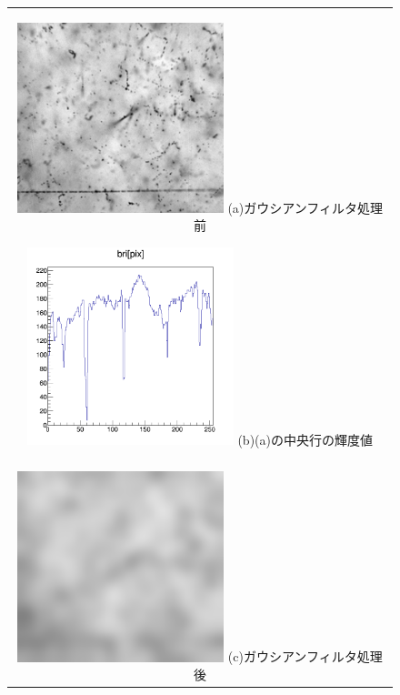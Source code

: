\documentclass[12pt,a4paper]{jarticle}
\begin{document}
\begin{figure}[htbp]
  \centering
      \begin{tabular}{c}
        \begin{minipage}{0.5\hsize}
          \centering
            \includegraphics[clip, width=60mm]{cont.png}
            \hspace{1.6cm} (a)ガウシアンフィルタ処理前
        \end{minipage}
        
        \begin{minipage}{0.5\hsize}
          \centering
            \includegraphics[clip, width=60mm]{cont_hist2.png}
            \hspace{1.6cm} (b)(a)の中央行の輝度値
        \end{minipage}
        \\
        \\
        \begin{minipage}{0.5\hsize}
          \centering
              \includegraphics[clip, width=60mm]{gau2.png}
              \hspace{1.6cm} (c)ガウシアンフィルタ処理後
          \end{minipage}
          

\end{tabular}
\end{figure}
\end{document}
